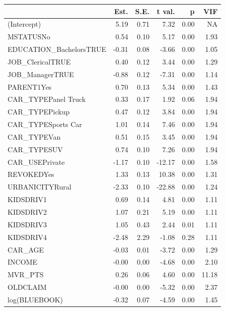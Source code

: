 \documentclass[]{article}
\begin{document}
\begin{table}[!h]
\centering
\begin{threeparttable}
\begin{tabular}{lrrrrr}
\toprule
  & Est. & S.E. & t val. & p & VIF\\
\midrule
\rowcolor{gray!6}  (Intercept) & 5.19 & 0.71 & 7.32 & 0.00 & NA\\
MSTATUSNo & 0.54 & 0.10 & 5.17 & 0.00 & 1.93\\
\rowcolor{gray!6}  EDUCATION\_BachelorsTRUE & -0.31 & 0.08 & -3.66 & 0.00 & 1.05\\
JOB\_ClericalTRUE & 0.40 & 0.12 & 3.44 & 0.00 & 1.29\\
\rowcolor{gray!6}  JOB\_ManagerTRUE & -0.88 & 0.12 & -7.31 & 0.00 & 1.14\\
\addlinespace
PARENT1Yes & 0.70 & 0.13 & 5.34 & 0.00 & 1.43\\
\rowcolor{gray!6}  CAR\_TYPEPanel Truck & 0.33 & 0.17 & 1.92 & 0.06 & 1.94\\
CAR\_TYPEPickup & 0.47 & 0.12 & 3.84 & 0.00 & 1.94\\
\rowcolor{gray!6}  CAR\_TYPESports Car & 1.01 & 0.14 & 7.46 & 0.00 & 1.94\\
CAR\_TYPEVan & 0.51 & 0.15 & 3.45 & 0.00 & 1.94\\
\addlinespace
\rowcolor{gray!6}  CAR\_TYPESUV & 0.74 & 0.10 & 7.26 & 0.00 & 1.94\\
CAR\_USEPrivate & -1.17 & 0.10 & -12.17 & 0.00 & 1.58\\
\rowcolor{gray!6}  REVOKEDYes & 1.33 & 0.13 & 10.38 & 0.00 & 1.31\\
URBANICITYRural & -2.33 & 0.10 & -22.88 & 0.00 & 1.24\\
\rowcolor{gray!6}  KIDSDRIV1 & 0.69 & 0.14 & 4.81 & 0.00 & 1.11\\
\addlinespace
KIDSDRIV2 & 1.07 & 0.21 & 5.19 & 0.00 & 1.11\\
\rowcolor{gray!6}  KIDSDRIV3 & 1.05 & 0.43 & 2.44 & 0.01 & 1.11\\
KIDSDRIV4 & -2.48 & 2.29 & -1.08 & 0.28 & 1.11\\
\rowcolor{gray!6}  CAR\_AGE & -0.03 & 0.01 & -3.72 & 0.00 & 1.29\\
INCOME & -0.00 & 0.00 & -4.68 & 0.00 & 2.10\\
\addlinespace
\rowcolor{gray!6}  MVR\_PTS & 0.26 & 0.06 & 4.60 & 0.00 & 11.18\\
OLDCLAIM & -0.00 & 0.00 & -5.32 & 0.00 & 2.37\\
\rowcolor{gray!6}  log(BLUEBOOK) & -0.32 & 0.07 & -4.59 & 0.00 & 1.45\\

\end{tabular}
\end{threeparttable}
\end{table}
\end{document}
